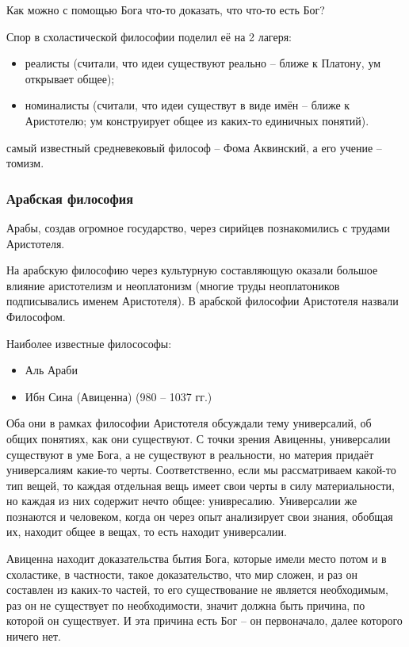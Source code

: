 \documentclass[a4paper, 12pt]{book} %
\begin{document}
Как можно с помощью Бога что-то доказать, что что-то есть Бог?

Спор в схоластической философии поделил её на 2 лагеря:
\begin{itemize}
\item реалисты (считали, что идеи существуют реально -- ближе к Платону, ум открывает общее); 
\item номиналисты (считали, что идеи существут в виде имён -- ближе к Аристотелю; ум конструирует общее из каких-то единичных понятий).
\end{itemize}

самый известный средневековый философ -- Фома Аквинский, а его учение -- томизм.

\subsubsection{Арабская философия}
Арабы, создав огромное государство, через сирийцев познакомились с трудами Аристотеля.

На арабскую философию через культурную составляющую оказали большое влияние аристотелизм и неоплатонизм (многие труды неоплатоников подписывались именем Аристотеля). В арабской философии Аристотеля назвали Философом.

Наиболее известные филосософы:
\begin{itemize}	
\item Аль Араби
\item Ибн Сина (Авиценна) (980 -- 1037 гг.)
\end{itemize}
Оба они в рамках философии Аристотеля обсуждали тему универсалий, об общих понятиях, как они существуют. С точки зрения Авиценны, универсалии существуют в уме Бога, а не существуют в реальности, но материя придаёт универсалиям какие-то черты. Соответственно, если мы рассматриваем какой-то тип вещей, то каждая отдельная вещь имеет свои черты в силу материальности, но каждая из них содержит нечто общее: унивресалию. Универсалии же познаются и человеком, когда он через опыт анализирует свои знания, обобщая их, находит общее в вещах, то есть находит универсалии.

Авиценна находит доказательства бытия Бога, которые имели место потом и в схоластике, в частности, такое доказательство, что мир сложен, и раз он составлен из каких-то частей, то его существование не является необходимым, раз он не существует по необходимости, значит должна быть причина, по которой он существует. И эта причина есть Бог -- он первоначало, далее которого ничего нет.
\end{document}
